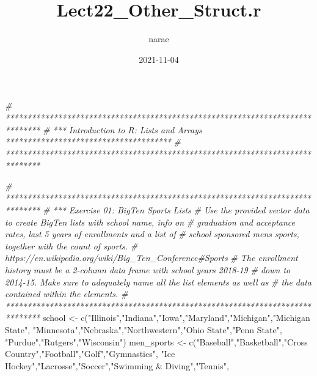 \documentclass[
]{article}
\title{Lect22\_Other\_Struct.r}
\author{narae}
\date{2021-11-04}
\newenvironment{Shaded}{\begin{snugshade}}{\end{snugshade}}
\newcommand{\CommentTok}[1]{\textcolor[rgb]{0.56,0.35,0.01}{\textit{#1}}}
\newcommand{\FunctionTok}[1]{\textcolor[rgb]{0.00,0.00,0.00}{#1}}
\newcommand{\NormalTok}[1]{#1}
\newcommand{\OtherTok}[1]{\textcolor[rgb]{0.56,0.35,0.01}{#1}}
\newcommand{\StringTok}[1]{\textcolor[rgb]{0.31,0.60,0.02}{#1}}
\begin{document}
\maketitle

\begin{Shaded}
\begin{Highlighting}[]
\CommentTok{\# ******************************************************************************}
\CommentTok{\# *** Introduction to R: Lists and Arrays **************************************}
\CommentTok{\# ******************************************************************************}

\CommentTok{\# ******************************************************************************}
\CommentTok{\# *** Exercise 01: BigTen Sports Lists }
\CommentTok{\# Use the provided vector data to create BigTen lists with school name, info on}
\CommentTok{\# graduation and acceptance rates, last 5 years of enrollments and a list of }
\CommentTok{\# school sponsored men\textquotesingle{}s sports, together with the count of sports. }
\CommentTok{\# https://en.wikipedia.org/wiki/Big\_Ten\_Conference\#Sports}
\CommentTok{\# The enrollment history must be a 2{-}column data frame with school years 2018{-}19 }
\CommentTok{\# down to 2014{-}15. Make sure to adequately name all the list elements as well as }
\CommentTok{\# the data contained within the elements.}
\CommentTok{\# ******************************************************************************}
\NormalTok{school }\OtherTok{\textless{}{-}} \FunctionTok{c}\NormalTok{(}\StringTok{"Illinois"}\NormalTok{,}\StringTok{"Indiana"}\NormalTok{,}\StringTok{"Iowa"}\NormalTok{,}\StringTok{"Maryland"}\NormalTok{,}\StringTok{"Michigan"}\NormalTok{,}\StringTok{"Michigan State"}\NormalTok{,}
            \StringTok{"Minnesota"}\NormalTok{,}\StringTok{"Nebraska"}\NormalTok{,}\StringTok{"Northwestern"}\NormalTok{,}\StringTok{"Ohio State"}\NormalTok{,}\StringTok{"Penn State"}\NormalTok{,}
            \StringTok{"Purdue"}\NormalTok{,}\StringTok{"Rutgers"}\NormalTok{,}\StringTok{"Wisconsin"}\NormalTok{)}
\NormalTok{men\_sports }\OtherTok{\textless{}{-}} \FunctionTok{c}\NormalTok{(}\StringTok{"Baseball"}\NormalTok{,}\StringTok{"Basketball"}\NormalTok{,}\StringTok{"Cross Country"}\NormalTok{,}\StringTok{"Football"}\NormalTok{,}\StringTok{"Golf"}\NormalTok{,}\StringTok{"Gymnastics"}\NormalTok{,}
                \StringTok{"Ice Hockey"}\NormalTok{,}\StringTok{"Lacrosse"}\NormalTok{,}\StringTok{"Soccer"}\NormalTok{,}\StringTok{"Swimming \& Diving"}\NormalTok{,}\StringTok{"Tennis"}\NormalTok{,}

\end{Highlighting}
\end{Shaded}
\end{document}
